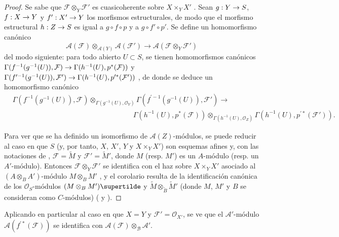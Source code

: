 \documentclass[oneside,10pt]{amsart}
\makeatletter
\newcommand{\ega@arrow}[2]{\mathchoice{#1}{#2}{#2}{#2}}
\renewcommand{\to}{\ega@arrow{\longrightarrow}{\rightarrow}}
\newcommand{\oldpage}[2][]{\marginnote{\normalfont\footnotesize\textbf{#1}~|~#2}\ignorespaces}
\makeatother
\begin{document}
\begin{proof}
Se sabe que $\mathcal{F}\otimes_Y\mathcal{F}'$ es cuasicoherente sobre $X\times_Y X'$ .
Sean $g:Y\to S$, $f:X\to Y$ y $f':X'\to Y$ los morfismos estructurales, de modo que el morfismo estructural
\oldpage[II]{11}
$h:Z\to S$ es igual a $g\circ f\circ p$ y a $g\circ f'\circ p'$.
Se define un homomorfismo canónico
\[
  \mathcal{A}(\mathcal{F})\otimes_{\mathcal{A}(Y)}\mathcal{A}(\mathcal{F}')
  \longrightarrow \mathcal{A}(\mathcal{F}\otimes_Y\mathcal{F}')
\]
del modo siguiente: para todo abierto $U\subset S$, se tienen homomorfismos canónicos
$\Gamma(f^{-1}(g^{-1}(U)),\mathcal{F})\to\Gamma(h^{-1}(U),p^*(\mathcal{F}))$ y $\Gamma(f^{\prime-1}(g^{-1}(U)),\mathcal{F}')\to\Gamma(h^{-1}(U),p^{\prime*}(\mathcal{F}'))$
, de donde se deduce un homomorfismo canónico
\[
  \begin{aligned}
  &\Gamma(f^{-1}(g^{-1}(U)),\mathcal{F})
    \otimes_{\Gamma(g^{-1}(U),\mathcal{O}_Y)}
    \Gamma(f^{\prime-1}(g^{-1}(U)),\mathcal{F}')\longrightarrow\\
  &\hspace{17em}
    \Gamma(h^{-1}(U),p^*(\mathcal{F}))
    \otimes_{\Gamma(h^{-1}(U),\mathcal{O}_Z)}
    \Gamma(h^{-1}(U),p^{\prime*}(\mathcal{F}')).
  \end{aligned}
\]

Para ver que se ha definido un isomorfismo de $\mathcal{A}(Z)$-módulos, se puede reducir al caso en que $S$ (y, por tanto, $X$, $X'$, $Y$ y $X\times_Y X'$) son esquemas afines y, con las notaciones de , $\mathcal{F}=\widetilde{M}$ y $\mathcal{F}'=\widetilde{M}'$, donde $M$ (resp. $M'$) es un $A$-módulo (resp. un $A'$-módulo).
Entonces $\mathcal{F}\otimes_Y\mathcal{F}'$ se identifica con el haz sobre $X\times_Y X'$ asociado al $(A\otimes_B A')$-módulo $M\otimes_B M'$ , y el corolario resulta de la identificación canónica de los $\mathcal{O}_S$-módulos $(M\otimes_B M')\supertilde$ y $\widetilde{M}\otimes_{\widetilde{B}}\widetilde{M}'$ (donde $M$, $M'$ y $B$ se consideran como $C$-módulos) ( y ).
\end{proof}

Aplicando en particular  al caso en que $X=Y$ y $\mathcal{F}'=\mathcal{O}_{X'}$, se ve que el $\mathcal{A}'$-módulo $\mathcal{A}(f^{\prime*}(\mathcal{F}))$ se identifica con $\mathcal{A}(\mathcal{F})\otimes_{\mathcal{B}}\mathcal{A}'$.
\end{document}
